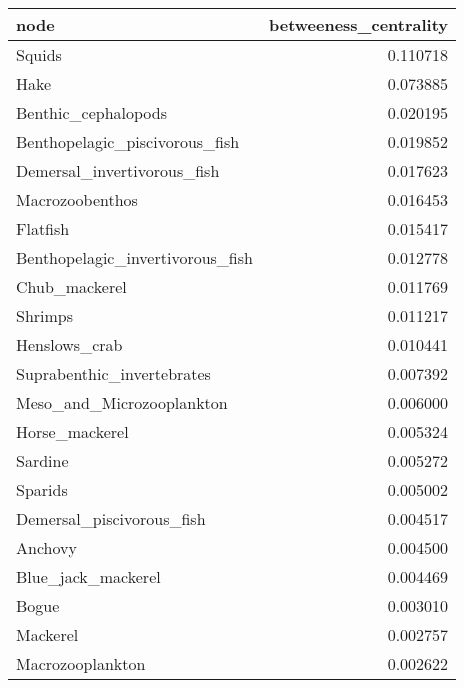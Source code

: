 \begin{tabular}{lr}
\toprule
                            node &  betweeness\_centrality \\
\midrule
                          Squids &               0.110718 \\
                            Hake &               0.073885 \\
             Benthic\_cephalopods &               0.020195 \\
  Benthopelagic\_piscivorous\_fish &               0.019852 \\
     Demersal\_invertivorous\_fish &               0.017623 \\
                 Macrozoobenthos &               0.016453 \\
                        Flatfish &               0.015417 \\
Benthopelagic\_invertivorous\_fish &               0.012778 \\
                   Chub\_mackerel &               0.011769 \\
                         Shrimps &               0.011217 \\
                   Henslows\_crab &               0.010441 \\
      Suprabenthic\_invertebrates &               0.007392 \\
       Meso\_and\_Microzooplankton &               0.006000 \\
                  Horse\_mackerel &               0.005324 \\
                         Sardine &               0.005272 \\
                         Sparids &               0.005002 \\
       Demersal\_piscivorous\_fish &               0.004517 \\
                         Anchovy &               0.004500 \\
              Blue\_jack\_mackerel &               0.004469 \\
                           Bogue &               0.003010 \\
                        Mackerel &               0.002757 \\
                Macrozooplankton &               0.002622 \\
\bottomrule
\end{tabular}
